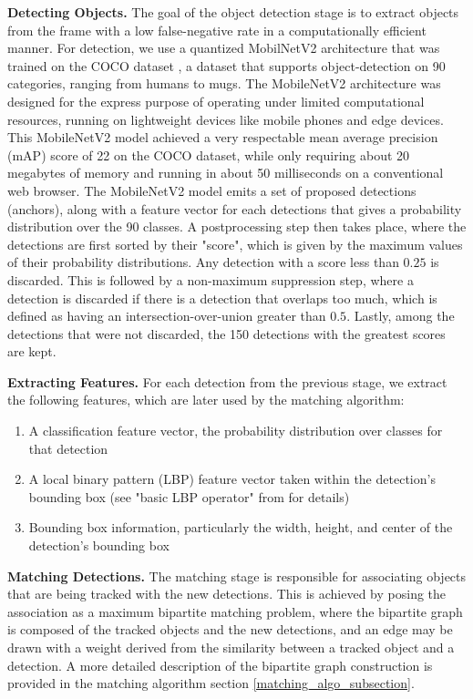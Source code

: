 \documentclass[10pt,twocolumn,letterpaper]{article}
\begin{document}
\textbf{Detecting Objects.}
The goal of the object detection stage is to extract objects from the frame with a low false-negative rate in a computationally efficient manner.
For detection, we use a quantized MobilNetV2 \cite{s2018mobilenetv2} architecture that was trained on the COCO dataset \cite{lin2014microsoft}, a dataset that supports object-detection on 90 categories, ranging from humans to mugs.
The MobileNetV2 architecture was designed for the express purpose of operating under limited computational resources, running on lightweight devices like mobile phones and edge devices.
This MobileNetV2 model achieved a very respectable mean average precision (mAP) score of 22 on the COCO dataset, while only requiring about 20 megabytes of memory and running in about 50 milliseconds on a conventional web browser.
The MobileNetV2 model emits a set of proposed detections (anchors), along with a feature vector for each detections that gives a probability distribution over the 90 classes.
A postprocessing step then takes place, where the detections are first sorted by their "score", which is given by the maximum values of their probability distributions.
Any detection with a score less than $0.25$ is discarded.
This is followed by a non-maximum suppression step, where a detection is discarded if there is a detection that overlaps too much, which is defined as having an intersection-over-union greater than $0.5$.
Lastly, among the detections that were not discarded, the 150 detections with the greatest scores are kept.



\textbf{Extracting Features.} 
For each detection from the previous stage, we extract the following features, which are later used by the matching algorithm:
\begin{enumerate}
\item A classification feature vector, the probability distribution over classes for that detection
\item A local binary pattern (LBP) feature vector taken within the detection's bounding box (see "basic LBP operator" from \cite{local_bin_patterns} for details)
\item Bounding box information, particularly the width, height, and center of the detection's bounding box
\end{enumerate}

\textbf{Matching Detections.} 
The matching stage is responsible for associating objects that are being tracked with the new detections.
This is achieved by posing the association as a maximum bipartite matching problem, where the bipartite graph is composed of the tracked objects and the new detections,
and an edge may be drawn with a weight derived from the similarity between a tracked object and a detection.
A more detailed description of the bipartite graph construction is provided in the matching algorithm section \ref{matching_algo_subsection}.
\end{document}
